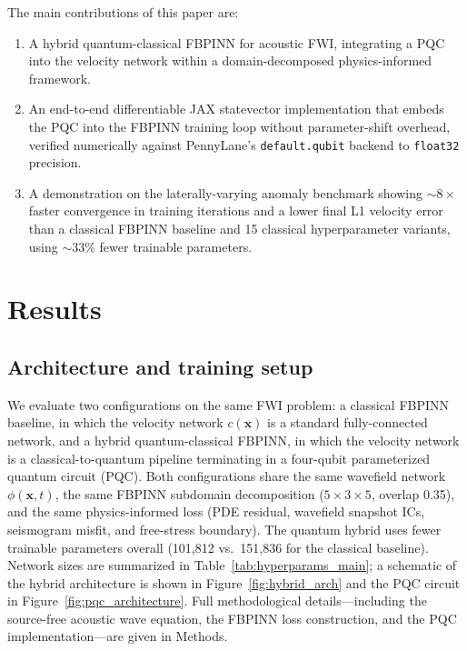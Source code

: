 The main contributions of this paper are:
\begin{enumerate}
    \item A hybrid quantum-classical FBPINN for acoustic FWI, integrating a PQC into the velocity network within a domain-decomposed physics-informed framework.
    \item An end-to-end differentiable JAX statevector implementation that embeds the PQC into the FBPINN training loop without parameter-shift overhead, verified numerically against PennyLane's \texttt{default.qubit} backend to \texttt{float32} precision.
    \item A demonstration on the laterally-varying anomaly benchmark showing $\sim$$8\times$ faster convergence in training iterations and a lower final L1 velocity error than a classical FBPINN baseline and 15 classical hyperparameter variants, using $\sim$$33$\% fewer trainable parameters.
\end{enumerate}

\section{Results}\label{sec:results}

\subsection{Architecture and training setup}
\label{sec:results_setup}

We evaluate two configurations on the same FWI problem: a classical FBPINN baseline, in which the velocity network $c(\mathbf{x})$ is a standard fully-connected network, and a hybrid quantum-classical FBPINN, in which the velocity network is a classical-to-quantum pipeline terminating in a four-qubit parameterized quantum circuit (PQC). Both configurations share the same wavefield network $\phi(\mathbf{x},t)$, the same FBPINN subdomain decomposition ($5\!\times\!3\!\times\!5$, overlap 0.35), and the same physics-informed loss (PDE residual, wavefield snapshot ICs, seismogram misfit, and free-stress boundary). The quantum hybrid uses fewer trainable parameters overall (101{,}812 vs.\ 151{,}836 for the classical baseline). Network sizes are summarized in Table~\ref{tab:hyperparams_main}; a schematic of the hybrid architecture is shown in Figure~\ref{fig:hybrid_arch} and the PQC circuit in Figure~\ref{fig:pqc_architecture}. Full methodological details---including the source-free acoustic wave equation, the FBPINN loss construction, and the PQC implementation---are given in Methods.



